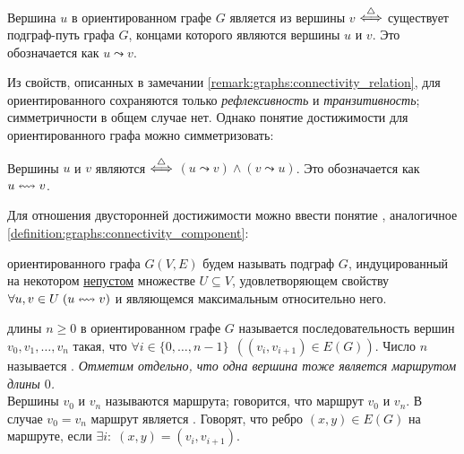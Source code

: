 \begin{definition}
    Вершина $ u $ в ориентированном графе $ G $ является  из вершины $ v $ $ \overset{\triangle}{\Longleftrightarrow} $ существует подграф-путь графа $ G $,
    концами которого являются вершины $ u $ и $ v $.
    Это обозначается как $ u \leadsto v $.
\end{definition}

Из свойств, описанных в замечании \ref{remark:graphs:connectivity_relation},
для ориентированного сохраняются только \emph{рефлексивность} и \emph{транзитивность};
симметричности в общем случае нет.
Однако понятие достижимости для ориентированного графа можно симметризовать:

\begin{definition}
    Вершины $ u $ и $ v $ являются  $ \overset{\triangle}{\Longleftrightarrow} $ $ (u \leadsto v) \wedge (v \leadsto u) $.
    Это обозначается как $ u \leftrightsquigarrow v $.
\end{definition}

Для отношения двусторонней достижимости можно ввести понятие , аналогичное \ref{definition:graphs:connectivity_component}:

\begin{definition}
    \label{definition:oriented_graphs:strong_connectivity_component}
     ориентированного графа $ G(V, E) $ будем называть подграф $ G $,
    индуцированный на некотором \underline{непустом} множестве $ U \subseteq V $,
    удовлетворяющем свойству $ \forall u, v \in U \; (u \leftrightsquigarrow v) $ и являющемся максимальным относительно него.
\end{definition}

\begin{definition}
     длины $ n \geqslant 0 $ в ориентированном графе $ G $ называется последовательность вершин $ v_0, v_1, \ldots, v_n $ такая,
    что $ \forall i \in \{ 0, \ldots, n-1 \} \;\, \left( (v_i, v_{i+1}) \in E(G) \right) $.
    \newline
    Число $ n $ называется .
    \newline
    \textit{Отметим отдельно, что одна вершина тоже является маршрутом длины $ 0 $.}
    \\[0.25\baselineskip]
    Вершины $ v_0 $ и $ v_n $ называются  маршрута;
    говорится, что маршрут  $ v_0 $ и $ v_n $.
    В случае $ v_0 = v_n $ маршрут является .
    \newline
    Говорят, что ребро $ (x, y) \in E(G) $  на маршруте, если $ \exists i: \; (x, y) = (v_i, v_{i+1}) $.
\end{definition}

